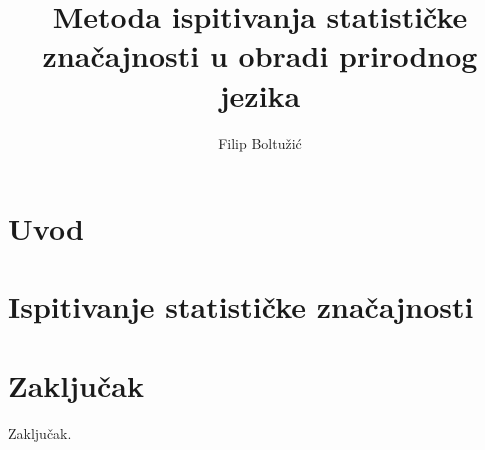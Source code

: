\documentclass[times, utf8, seminar]{fer}
\begin{document}

\title{Metoda ispitivanja statističke značajnosti u obradi prirodnog jezika}

\author{Filip Boltužić}
\maketitle

\tableofcontents

\chapter{Uvod}



\chapter{Ispitivanje statističke značajnosti}


\chapter{Zaključak}
Zaključak.



\end{document}
